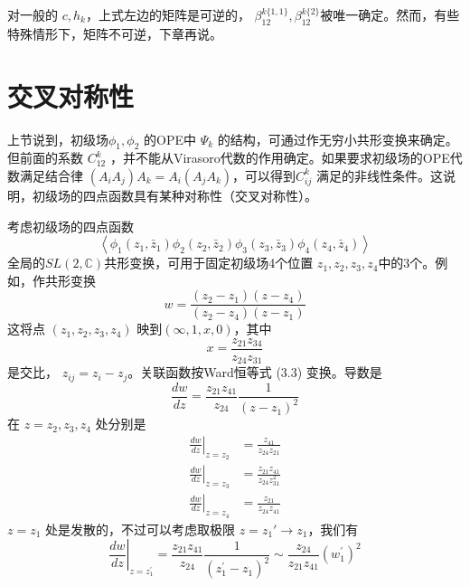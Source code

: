 对一般的 $c,h_k $，上式左边的矩阵是可逆的， $\beta_{12}^{k\{1,1\}},\beta_{12}^{k\{2\}} $被唯一确定。然而，有些特殊情形下，矩阵不可逆，下章再说。

\section{交叉对称性}
上节说到，初级场$ \phi_1,\phi_2$ 的OPE中 $\Psi_k$ 的结构，可通过作无穷小共形变换来确定。但前面的系数 $C_{12}^k$ ，并不能从Virasoro代数的作用确定。如果要求初级场的OPE代数满足结合律 $\left(A_{i} A_{j}\right) A_{k}=A_{i}\left(A_{j} A_{k}\right) $，可以得到$ C_{ij}^k$ 满足的非线性条件。这说明，初级场的四点函数具有某种对称性（交叉对称性）。

考虑初级场的四点函数
\begin{equation}
	\left\langle\phi_{1}\left(z_{1}, \bar{z}_{1}\right) \phi_{2}\left(z_{2}, \bar{z}_{2}\right) \phi_{3}\left(z_{3}, \bar{z}_{3}\right) \phi_{4}\left(z_{4}, \bar{z}_{4}\right)\right\rangle
\end{equation}
全局的$ SL(2,\mathbb{C}) $共形变换，可用于固定初级场4个位置 $z_1,z_2,z_3,z_4 $中的3个。例如，作共形变换
\begin{equation}
	w=\frac{\left(z_{2}-z_{1}\right)\left(z-z_{4}\right)}{\left(z_{2}-z_{4}\right)\left(z-z_{1}\right)}
\end{equation}
这将点 $(z_1,z_2,z_3,z_4)$ 映到$ (\infty,1,x,0) $，其中
\begin{equation}
x=\frac{z_{21}z_{ 34}}{z_{24} z_{31}}
\end{equation}
是交比， $z_{ij}=z_i-z_j $。关联函数按Ward恒等式 (3.3) 变换。导数是
\begin{equation}
\frac{d w}{d z}=\frac{z_{21} z_{41}}{z_{24}} \frac{1}{\left(z-z_{1}\right)^{2}}
\end{equation}
在 $z=z_2,z_3,z_4$ 处分别是
\begin{equation}
	\begin{aligned} \left.\frac{d w}{d z}\right|_{z=z_{2}} & =\frac{z_{41}}{z_{24} z_{21}} \\ \left.\frac{d w}{d z}\right|_{z=z_{3}} & =\frac{z_{21} z_{41}}{z_{24} z_{31}^{2}} \\ \left.\frac{d w}{d z}\right|_{z=z_{4}} & =\frac{z_{21}}{z_{24} z_{41}} \end{aligned}
\end{equation}
$z=z_1$ 处是发散的，不过可以考虑取极限 $z=z_1'\to z_1 $，我们有
\begin{equation}
	\left.\frac{d w}{d z}\right|_{z=z_{1}^{\prime}}=\frac{z_{21} z_{41}}{z_{24}} \frac{1}{\left(z_{1}^{\prime}-z_{1}\right)^{2}} \sim \frac{z_{24}}{z_{21} z_{41}}\left(w_{1}^{\prime}\right)^{2}
\end{equation}
